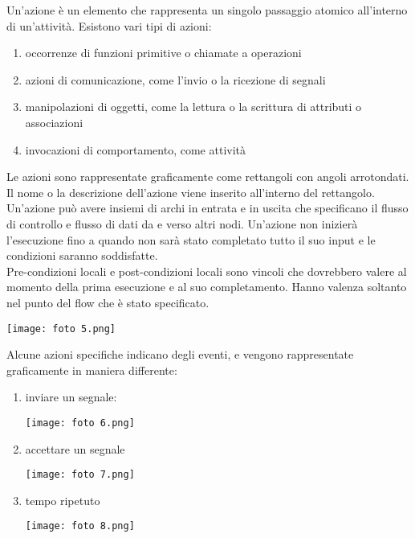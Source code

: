\documentclass{article}
\begin{document}
Un'azione è un elemento che rappresenta un singolo passaggio atomico all’interno di un’attività. Esistono vari tipi di azioni:
\begin{enumerate}
    \renewcommand{\labelenumi}{-}
    \item occorrenze di funzioni primitive o chiamate a operazioni
    \item azioni di comunicazione, come l'invio o la ricezione di segnali
    \item manipolazioni di oggetti, come la lettura o la scrittura di attributi o associazioni
    \item invocazioni di comportamento, come attività
\end{enumerate}
Le azioni sono rappresentate graficamente come rettangoli con angoli arrotondati. Il nome o la descrizione dell'azione viene inserito all'interno del rettangolo. Un'azione può avere insiemi di archi in entrata e in uscita che specificano il flusso di controllo e flusso di dati da e verso altri nodi. Un'azione non inizierà l'esecuzione fino a quando non sarà stato completato tutto il suo input e le condizioni saranno soddisfatte.\vspace{14pt}\\
Pre-condizioni locali e post-condizioni locali sono vincoli che dovrebbero valere al momento della prima esecuzione e al suo completamento. Hanno valenza soltanto nel punto del flow che è stato specificato.
\begin{center}
    \texttt{[image: foto 5.png]}
\end{center}
Alcune azioni specifiche indicano degli eventi, e vengono rappresentate graficamente in maniera differente:
\begin{enumerate}
    \renewcommand{\labelenumi}{-}
    \item inviare un segnale:
    \begin{center}
        \texttt{[image: foto 6.png]}
    \end{center}
    \item accettare un segnale
    \begin{center}
        \texttt{[image: foto 7.png]}
    \end{center}
    \item tempo ripetuto
    \begin{center}
        \texttt{[image: foto 8.png]}
    \end{center}
\end{enumerate}
\end{document}

